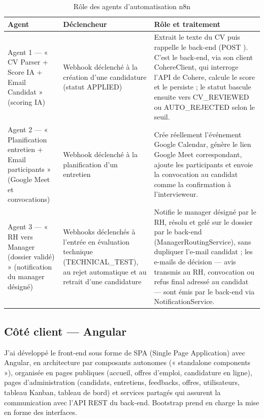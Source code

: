 \setcounter{table}{2}
\begin{table}[!ht]
\centering
\caption{Rôle des agents d’automatisation n8n}
\label{tab_2_3}
\renewcommand{\arraystretch}{1.25}\footnotesize
\setlength{\tabcolsep}{4pt}%
\begin{tabular}{|P{0.166\textwidth}|P{0.236\textwidth}|P{0.545\textwidth}|}
\hline
\textbf{Agent} & \textbf{Déclencheur} & \textbf{Rôle et traitement} \\
\hline
Agent 1 — « CV Parser + Score IA + Email Candidat » (scoring IA) & Webhook déclenché à la création d’une candidature (statut APPLIED) & Extrait le texte du CV puis rappelle le back-end (POST ). C’est le back-end, via son client CohereClient, qui interroge l’API de Cohere, calcule le score et le persiste ; le statut bascule ensuite vers CV\_REVIEWED ou AUTO\_REJECTED selon le seuil. \\
\hline
Agent 2 — « Planification entretien + Email participants » (Google Meet et convocations) & Webhook déclenché à la planification d’un entretien & Crée réellement l’événement Google Calendar, génère le lien Google Meet correspondant, ajoute les participants et envoie la convocation au candidat comme la confirmation à l’intervieweur. \\
\hline
Agent 3 — « RH vers Manager (dossier validé) » (notification du manager désigné) & Webhooks déclenchés à l’entrée en évaluation technique (TECHNICAL\_TEST), au rejet automatique et au retrait d’une candidature & Notifie le manager désigné par le RH, résolu et gelé sur le dossier par le back-end (Manager\-Routing\-Service), sans dupliquer l’e-mail candidat ; les e-mails de décision — avis transmis au RH, convocation ou refus final adressé au candidat — sont émis par le back-end via NotificationService. \\
\hline
\end{tabular}
\end{table}
\subsection{Côté client — Angular}
\label{sec_2_3_2}
J’ai développé le front-end sous forme de SPA (Single Page Application) avec Angular, en architecture par composants autonomes (« standalone components »), organisée en pages publiques (accueil, offres d’emploi, candidature en ligne), pages d’administration (candidats, entretiens, feedbacks, offres, utilisateurs, tableau Kanban, tableau de bord) et services partagés qui assurent la communication avec l’API REST du back-end. Bootstrap prend en charge la mise en forme des interfaces.

